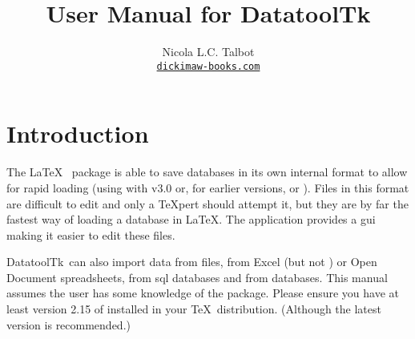 
\usepackage{fontspec}
\setmainfont{Linux Libertine O}
\usepackage{verbatim}
\usepackage
 [
    novref,
 ]{texjavahelp}

\hypersetup{colorlinks,linkcolor=blue}


\newcommand{\actionoptval}[2]{\actionopt{#1}\dequals #2}
\newcommand{\actionoptvalm}[2]{\actionopt{#1}\dequals \marg{#2}}

\newcommand{\appname}{DatatoolTk}

\title{User Manual for \appname}
\author{Nicola L.C. Talbot\\\href{https://www.dickimaw-books.com/}{\nolinkurl{dickimaw-books.com}}}


\GlsXtrLoadResources[src={datatooltk,\langbibsrcs},
 \TeXJavaHelpSymbolResourceOptions
]

\GlsXtrLoadResources[src={datatooltk,\langbibsrcs},
 \TeXJavaHelpGlsResourceOptions
]


\maketitle
\frontmatter
\tableofcontents
\listoffigures

\mainmatter
\chapter{Introduction}
\label{sec:introduction}

The \LaTeX\  package is able to save databases in its
own internal format to allow for rapid loading (using
 with
 v3.0 or, for earlier versions,
 or
).  Files in this
 format are difficult to edit and only a \TeX pert should
attempt it, but they are by far the fastest way of loading a
 \gls{database} in \LaTeX. The 
application provides a \gls{gui} making it easier to edit these
files. 

\appname\ can also import data from  files, from
Excel  (but not )
or Open Document  spreadsheets, from 
\gls{sql} databases and from  databases.
This manual assumes the user has some knowledge of the
 package. Please ensure you have at least version
2.15 of  installed in your \TeX\ distribution.
(Although the latest version is recommended.)


